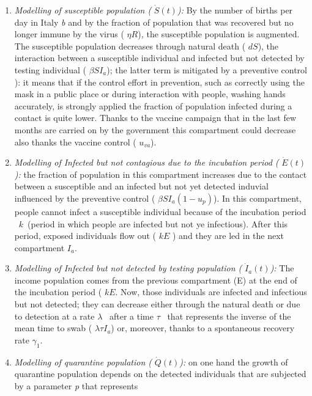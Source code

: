 \documentclass[a4paper]{article}
\begin{document}
\begin{enumerate}
\item \textit{\textcolor[rgb]{0.07450981,0.078431375,0.07450981}{Modelling of susceptible population (}} $\dot
S\left(t\right)$\textit{): }By the number of births per day in Italy \textit{b }and by the fraction of population that
was recovered but no longer immune by the virus ( $\mathit{\eta R}$)\textit{, }the susceptible population is augmented.
The susceptible population decreases through natural death ( $\mathit{dS}$), the interaction between a susceptible
individual and infected but not detected by testing individual ( $\mathit{\beta S}I_a$); the latter term is mitigated
by a preventive control ): it means that if the control effort in prevention, such as correctly using the mask in a
public place or during interaction with people, washing hands accurately, is strongly applied the fraction of
population infected during a contact is quite lower. Thanks to the vaccine campaign that in the last few months are
carried on by the government this compartment could decrease also thanks the vaccine control ( $u_{\mathit{va}}$). 
\item \textit{Modelling of Infected but not contagious due to the incubation period (} $\dot E\left(t\right)$\textit{):
}the fraction of population in this compartment increases due to the contact between a susceptible and an infected but
not yet detected induvial influenced by the preventive control ( $\mathit{\beta S}I_a\left(1-u_p\right)$). In this
compartment, people cannot infect a susceptible individual because of the incubation period \  $k$\ (period in which
people are infected but not ye infectious). After this period, exposed individuals flow out ( $\mathit{kE}$ ) and they
are led in the next compartment  $I_a$.
\item \textit{Modelling of Infected but not detected by testing population (} $\dot I_a\left(t\right)$\textit{): }The
income population comes from the previous compartment (E) at the end of the incubation period ( $\mathit{kE}$. Now,
those individuals are infected and infectious but not detected; they can decrease either through the natural death or
due to detection at a rate  $\lambda $ \ after a time  $\tau $ \ that represents the inverse of the mean time to swab (
$\mathit{\lambda \tau }I_a$) or, moreover, thanks to a spontaneous recovery rate  $\gamma _1$. 
\item \textit{Modelling of quarantine population (} $\dot Q\left(t\right)$\textit{): }on one hand the growth of
quarantine population depends on the detected individuals that are subjected by a parameter \textit{p }that represents

\end{enumerate}
\end{document}
